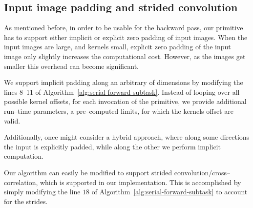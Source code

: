   \subsection{Input image padding and strided convolution}

  As mentioned before, in order to be usable for the backward pass,
  our primitive has to support either implicit or explicit zero
  padding of input images.  When the input images are large, and
  kernels small, explicit zero padding of the input image only
  slightly increases the computational cost.  However, as the images
  get smaller this overhead can become significant.

  We support implicit padding along an arbitrary of dimensions by
  modifying the lines 8--11 of
  Algorithm~\ref{alg:serial-forward-subtask}.  Instead of looping over
  all possible kernel offsets, for each invocation of the primitive,
  we provide additional run--time parameters, a pre--computed limits,
  for which the kernels offset are valid.

  Additionally, once might consider a hybrid approach, where along
  some directions the input is explicitly padded, while along the
  other we perform implicit computation.

  Our algorithm can easily be modified to support strided
  convolution/cross--correlation, which is supported in our
  implementation.  This is accomplished by simply modifying the line
  $18$ of Algorithm~\ref{alg:serial-forward-subtask} to account for
  the strides.
